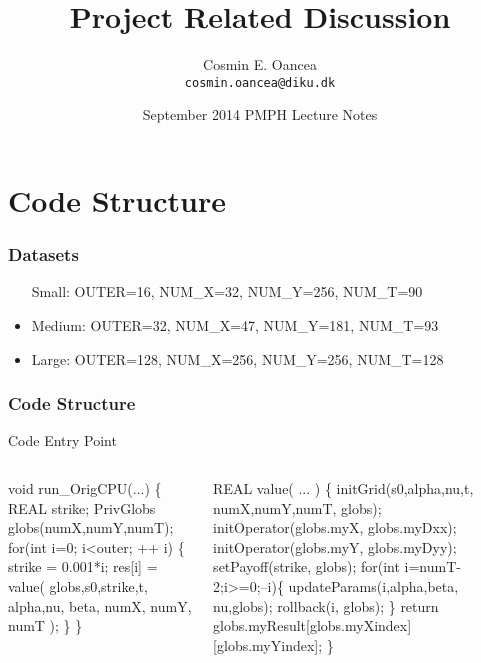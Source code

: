\documentclass{beamer}
\title[Project]{Project Related Discussion}
\author[C.~Oancea]{Cosmin E. Oancea\\{\tt cosmin.oancea@diku.dk}}
\institute{Department of Computer Science (DIKU)\\University of Copenhagen}
\date[Sept 2014]{September 2014 PMPH Lecture Notes}
\renewcommand{\emph}[1]{\textcolor{structure}{#1}}
\newcommand{\emp}[1]{\textcolor{DikuRed}{ #1}}
\begin{document}
\titleslide


\begin{frame}[fragile]
	\tableofcontents
\end{frame}


\section{Code Structure}

\begin{frame}[fragile,t]
  \frametitle{Datasets} %
\begin{itemize}
    \item[Small:] OUTER=16, NUM\_X=32, NUM\_Y=256, NUM\_T=90
    \item{Medium:} OUTER=32, NUM\_X=47, NUM\_Y=181, NUM\_T=93
    \item{Large:} OUTER=128, NUM\_X=256, NUM\_Y=256, NUM\_T=128
\end{itemize}

\end{frame}


\begin{frame}[fragile,t]
  \frametitle{Code Structure} %

\begin{block}{Code Entry Point}
\begin{columns}
\begin{colorcode}
void   run_OrigCPU(...) \{
  REAL strike;
  PrivGlobs globs(numX,numY,numT);
  \emph{for(int i=0; i<outer; ++ i)} \{
    strike = 0.001*i;
    res[i] = \emp{value}( globs,s0,strike,t,
                    alpha,nu,   beta,
                    numX, numY, numT );
  \}
\}
\end{colorcode}
\begin{colorcode}
REAL   \emp{value}( ... ) \{
  initGrid(s0,alpha,nu,t, 
           numX,numY,numT, 
           globs);
  initOperator(globs.myX,
               globs.myDxx);
  initOperator(globs.myY,
               globs.myDyy);
  setPayoff(strike, globs);
  \alert{for(int i=numT-2;i>=0;--i)}\{
    updateParams(i,alpha,beta,
                 nu,globs);
    rollback(i, globs);
  \}
  return globs.myResult[globs.myXindex]
                       [globs.myYindex];
\}
\end{colorcode}
\end{columns}
\end{block} 

\end{frame}
\end{document}
